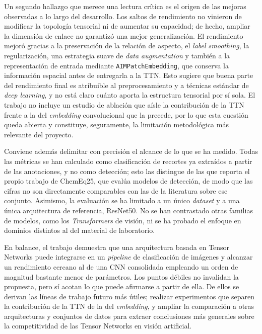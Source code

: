 Un segundo hallazgo que merece una lectura crítica es el origen de las mejoras observadas a lo largo del desarrollo. Los saltos de rendimiento no vinieron de modificar la topología tensorial ni de aumentar su capacidad; de hecho, ampliar la dimensión de enlace no garantizó una mejor generalización. El rendimiento mejoró gracias a la preservación de la relación de aspecto, el \textit{label smoothing}, la regularización, una estrategia suave de \textit{data augmentation} y también a la representación de entrada mediante \texttt{AIMPatchEmbedding}, que conserva la información espacial antes de entregarla a la TTN. Esto sugiere que buena parte del rendimiento final es atribuible al preprocesamiento y a técnicas estándar de \textit{deep learning}, y no está claro cuánto aporta la estructura tensorial por sí sola. El trabajo no incluye un estudio de ablación que aísle la contribución de la TTN frente a la del \textit{embedding} convolucional que la precede, por lo que esta cuestión queda abierta y constituye, seguramente, la limitación metodológica más relevante del proyecto.

Conviene además delimitar con precisión el alcance de lo que se ha medido. Todas las métricas se han calculado como clasificación de recortes ya extraídos a partir de las anotaciones, y no como detección; esto las distingue de las que reporta el propio trabajo de ChemEq25, que evalúa modelos de detección, de modo que las cifras no son directamente comparables con las de la literatura sobre ese conjunto. Asimismo, la evaluación se ha limitado a un único \textit{dataset} y a una única arquitectura de referencia, ResNet50. No se han contrastado otras familias de modelos, como los \textit{Transformers} de visión, ni se ha probado el enfoque en dominios distintos al del material de laboratorio.

En balance, el trabajo demuestra que una arquitectura basada en Tensor Networks puede integrarse en un \textit{pipeline} de clasificación de imágenes y alcanzar un rendimiento cercano al de una CNN consolidada empleando un orden de magnitud bastante menor de parámetros. Los puntos débiles no invalidan la propuesta, pero sí acotan lo que puede afirmarse a partir de ella. De ellos se derivan las líneas de trabajo futuro más útiles; realizar experimentos que separen la contribución de la TTN de la del \textit{embedding}, y ampliar la comparación a otras arquitecturas y conjuntos de datos para extraer conclusiones más generales sobre la competitividad de las Tensor Networks en visión artificial.

